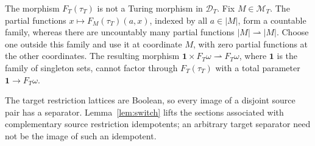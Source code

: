 The morphism $F_T(\tau_T)$ is not a Turing morphism in $\mathcal D_T$.
Fix $M\in\mathcal M_T$. The partial functions
$x\mapsto F_M(\tau_T)(a,x)$, indexed by all $a\in|M|$, form a
countable family, whereas there are uncountably many partial
functions $|M|\rightharpoonup|M|$.
Choose one outside this family and use it at coordinate $M$,
with zero partial functions at the other coordinates.
The resulting morphism
$\mathbf1\times F_T\omega\rightharpoonup F_T\omega$,
where $\mathbf1$ is the family of singleton sets, cannot factor
through $F_T(\tau_T)$ with a total parameter
$\mathbf1\to F_T\omega$.

The target restriction lattices are Boolean, so every image of a disjoint source
pair has a separator. Lemma~\ref{lem:switch} lifts the sections
associated with complementary source restriction idempotents;
an arbitrary target separator need not be the image of such an
idempotent.

